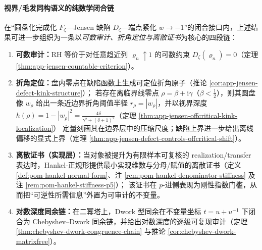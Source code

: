 \paragraph{视界/毛发同构语义的纯数学闭合链}\label{par:app-jensen-horizon-hair-closed-chain}
在“圆盘化完成化 \(F_{\zeta}\)—Jensen 缺陷 \(D_{\zeta}\)—端点紧化 \(w\to-1\)”的闭合接口内，上述结果可进一步组织为一条以\emph{可数审计、折角定位与离散证书}为核心的四段链：
\begin{enumerate}
  \item \textbf{可数审计：}RH 等价于对任意趋近列 \(\varrho_n\uparrow 1\) 的可数约束 \(D_{\zeta}(\varrho_n)=0\)（定理 \ref{thm:app-jensen-countable-criterion}）。
  \item \textbf{折角定位：}盘内零点在缺陷函数上生成可定位折角原子（推论 \ref{cor:app-jensen-defect-kink-structure}）；
  若存在离临界线零点 \(\rho=\beta+\mathrm{i}\gamma\)（\(\beta<\tfrac12\)），则其圆盘像 \(w_{\rho}\) 给出一条近边界折角阈值半径 \(r_{\rho}=|w_{\rho}|\)，并以视界深度
  \(h(\rho)=1-|w_{\rho}|^{2}=\frac{4\delta}{\gamma^{2}+(\delta+1)^{2}}\)（定理 \ref{thm:app-jensen-offcritical-kink-localization}）
  定量刻画其在边界层中的压缩尺度；缺陷上界进一步给出离线偏移的显式上界（定理 \ref{thm:app-jensen-defect-controls-offcritical-shift}）。
  \item \textbf{离散证书（实现层）：}当对象被提升为有限样本可复核的 realization/transfer 表达时，Hankel-正规形提供最小实现维数与分母/赋值的离散证书（定义 \ref{def:pom-hankel-normal-form}、注 \ref{rem:pom-hankel-denominator-stiffness} 及注 \ref{rem:pom-hankel-stiffness-p5}）；
  该证书在 \(p\)-进侧表现为刚性指数门槛，从而把“可逆性所需信息”外置为可审计的不变量。
  \item \textbf{对数深度同余链：}在二幂塔上，Dwork 型同余在不变量坐标 \(t=u+u^{-1}\) 下闭合为 Chebyshev--Dwork 同余链，并给出对数深度的逐级可复现审计（定理 \ref{thm:chebyshev-dwork-congruence-chain} 与推论 \ref{cor:chebyshev-dwork-matrixfree}）。
\end{enumerate}
